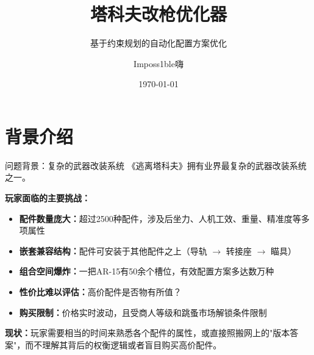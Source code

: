 \documentclass[aspectratio=169]{beamer}
\begin{document}
\title[塔科夫改枪优化器]{塔科夫改枪优化器}
\subtitle{基于约束规划的自动化配置方案优化}
\author{Imposs1ble嗨}
\date{\today}

\begin{frame}
    \titlepage
\end{frame}

\section{背景介绍}

\begin{frame}{问题背景：复杂的武器改装系统}
    《逃离塔科夫》拥有业界最复杂的武器改装系统之一。

    \vspace{0.3cm}
    \textbf{玩家面临的主要挑战：}
    \begin{itemize}
        \item \textbf{配件数量庞大：}超过2500种配件，涉及后坐力、人机工效、重量、精准度等多项属性
        \item \textbf{嵌套兼容结构：}配件可安装于其他配件之上（导轨 $\to$ 转接座 $\to$ 瞄具）
        \item \textbf{组合空间爆炸：}一把AR-15有50余个槽位，有效配置方案多达数万种
        \item \textbf{性价比难以评估：}高价配件是否物有所值？
        \item \textbf{购买限制：}价格实时波动，且受商人等级和跳蚤市场解锁条件限制
    \end{itemize}

    \vspace{0.3cm}
    \textbf{现状：}玩家需要相当的时间来熟悉各个配件的属性，或直接照搬网上的"版本答案"，而不理解其背后的权衡逻辑或者盲目购买高价配件。
\end{frame}
\end{document}
